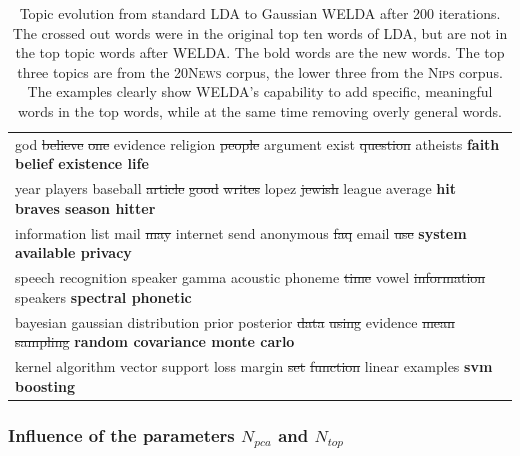\documentclass[
        a4paper,
        titlepage,
        twoside,
        parskip
        ]{scrbook}
\newcommand{\ra}[1]{\renewcommand{\arraystretch}{#1}}
\theoremstyle{break}
\begin{document}
\begin{table}[]
  \ra{1.15}
  \centering
  \caption{Topic evolution from standard LDA to Gaussian WELDA after 200 iterations. The crossed out words were in the original top ten words of LDA, but are not in the top topic words after WELDA. The bold words are the new words. The top three topics are from the \textsc{20News} corpus, the lower three from the \textsc{Nips} corpus. The examples clearly show WELDA's capability to add specific, meaningful words in the top words, while at the same time removing overly general words.}
  \label{table:topic_development}
  \begin{tabular}{p{13.5cm}}
    \toprule
    god \sout{believe} \sout{one} evidence religion \sout{people} argument exist \sout{question} atheists \textbf{faith belief existence life} \\
    year players baseball \sout{article} \sout{good} \sout{writes} lopez \sout{jewish} league average \textbf{hit braves season hitter} \\
    information list mail \sout{may} internet send anonymous \sout{faq} email \sout{use} \textbf{system available privacy} \\
    \midrule
    speech recognition speaker gamma acoustic phoneme \sout{time} vowel \sout{information} speakers \textbf{spectral phonetic} \\
    bayesian gaussian distribution prior posterior \sout{data} \sout{using} evidence \sout{mean} \sout{sampling} \textbf{random covariance monte carlo} \\
    kernel algorithm vector support loss margin \sout{set} \sout{function} linear examples \textbf{svm boosting} \\
    \bottomrule
  \end{tabular}
\end{table}

\subsubsection{Influence of the parameters $N_{pca}$ and $N_{top}$}
\end{document}
